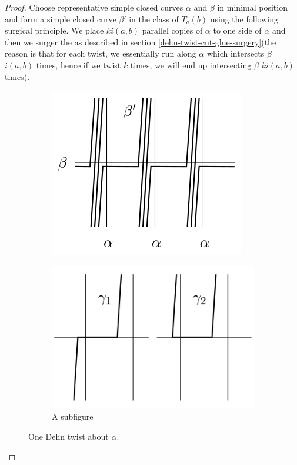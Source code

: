 \documentclass[reqno]{amsart}
\theoremstyle{definition}
\theoremstyle{remark}
\begin{document}
\begin{proof}
    Choose representative simple closed curves
    $\alpha$ and $\beta$ in minimal position and form
    a simple closed curve $\beta'$ in the class
    of $T_a(b)$ using the following surgical principle.
    We place $k i\left( a,b \right) $ parallel copies of
    $\alpha$ to one side of $\alpha$ and
    then we surger the as described in section
    \ref{dehn-twist-cut-glue-surgery}(the reason is that
    for each twist, we essentially run along $\alpha$ which
    intersects $\beta$ $i(a,b)$ times, hence if we twist
    $k$ times, we will end up intersecting $\beta$ 
    $ k i \left( a,b \right) $ times).


    \begin{figure}[H]
\centering
\begin{subfigure}{.5\textwidth}
  \centering
  \includegraphics[width=.8\linewidth]{prop32.png}
  \caption{}
  \label{fig:sub1}
\end{subfigure}%
\begin{subfigure}{.5\textwidth}
  \centering
  \includegraphics[width=.9\linewidth]{prop32b.png}
  \caption{A subfigure}
  \label{fig:sub2}
\end{subfigure}
\label{fig:test}
\caption{One Dehn twist about $\alpha$.}
\end{figure}


\end{proof}
\end{document}
